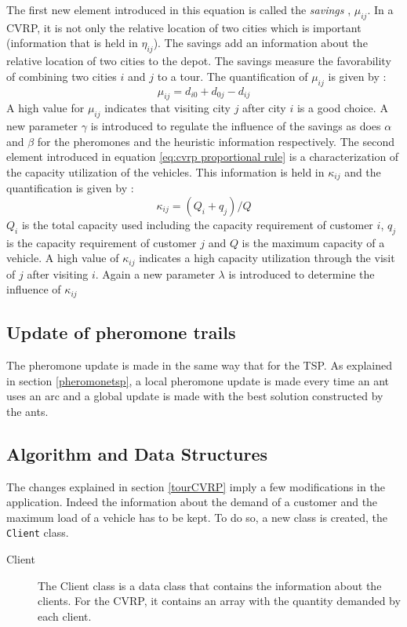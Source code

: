 The first new element introduced in this equation is called the \textit{savings} , $\mu_{ij}$. In a CVRP, it is not only the relative location of two cities which is important (information that is held in $\eta_{ij}$). The savings add an information about the relative location of two cities to the depot. The savings measure the favorability of combining two cities $i$ and $j$ to a tour. The quantification of $\mu_{ij}$ is given by :
\begin{equation}
	\mu_{ij} = d_{i0} + d_{0j} - d_{ij}
	\label{eq:savings}
\end{equation}
A high value for $\mu_{ij}$ indicates that visiting city $j$ after city $i$ is a good choice. A new parameter $\gamma$ is introduced to regulate the influence of the savings as does $\alpha$ and $\beta$ for the pheromones and the heuristic information respectively.
The second element introduced in equation \ref{eq:cvrp proportional rule} is a characterization of the capacity utilization of the vehicles. This information is held in $\kappa_{ij}$ and the quantification is given by :
\begin{equation}
 \kappa_{ij} = (Q_i + q_j)/Q
 \label{eq:capacity utilization}
\end{equation}
$Q_i$ is the total capacity used including the capacity requirement of customer $i$, $q_j$ is the capacity requirement of customer $j$ and $Q$ is the maximum capacity of a vehicle.
A high value of $\kappa_{ij}$ indicates a high capacity utilization through the visit of $j$ after visiting $i$. Again a new parameter $\lambda$ is introduced to determine the influence of $\kappa_{ij}$

\subsection{Update of pheromone trails}
The pheromone update is made in the same way that for the TSP. As explained in section \ref{pheromonetsp}, a local pheromone update is made every time an ant uses an arc and a global update is made with the best solution constructed by the ants.

\subsection{Algorithm and Data Structures}
The changes explained in section \ref{tourCVRP} imply a few modifications in the application. Indeed the information about the demand of a customer and the maximum load of a vehicle has to be kept. To do so, a new class is created, the \texttt{Client} class.
\begin{description}
\item[Client] The Client class is a data class that contains the information about the clients. For the CVRP, it contains an array with the quantity demanded by each client. 
\end{description}

